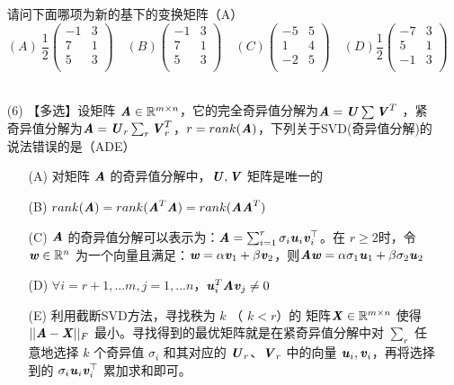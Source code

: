 \documentclass[12pt,a4paper,openany,twoside]{ctexbook}
\begin{document}
\begin{exercise}
\begin{itemize}
			请问下面哪项为新的基下的变换矩阵（A）	
		$$
		(A)\  \frac{1}{2}
\begin{pmatrix}
-1 & 3 \\
7 & 1 \\
5 & 3 \\
\end{pmatrix}
\quad
(B) \begin{pmatrix}
-1 & 3 \\
7 & 1 \\
5 & 3 \\
\end{pmatrix}
\quad
(C) \begin{pmatrix}
-5 & 5 \\
1 & 4 \\
-2 & 5 \\
\end{pmatrix}
\quad
(D) \frac{1}{2}
\begin{pmatrix}
-7 & 3 \\
5 & 1 \\
-1 & 3 \\
\end{pmatrix}
		$$
\\
		\item [(6)] 【多选】设矩阵 $\MA\in \mathbb{R}^{m \times n}$，它的完全奇异值分解为$\MA=\MU \sum \MV^T$ ，紧奇异值分解为$\MA=\MU_r \sum_r \MV_r^T$，$r=rank(\MA)$，下列关于SVD(奇异值分解)的说法错误的是（ADE）
		
		
		\begin{itemize}
			\item [(A)] 对矩阵 $\MA$ 的奇异值分解中，$\MU,\MV$ 矩阵是唯一的
			\item [(B)] $rank(\MA)=rank(\MA^T\MA)=rank(\MA\MA^T)$
			\item [(C)] $\MA$ 的奇异值分解可以表示为：$\MA = \sum_{i=1}^r \sigma_i \Vu_i \Vv_i^\top$。在 $r \geq 2 $时，令 $\Vw \in \mathbb{R}^n $ 为一个向量且满足：$\Vw = \alpha \Vv_1 + \beta \Vv_2$，则$\MA\Vw=\alpha \sigma_1 \Vu_1+\beta \sigma_2 \Vu_2$
			\item [(D)] $\forall i=r+1,...m,j=1,...n$，$\Vu_i^T\MA\Vv_j\not=0$
			\item [(E)] 利用截断SVD方法，寻找秩为 $k$ （ $k<r$）的 矩阵$\MX\in \mathbb{R}^{m \times n}$ 使得 $||\MA-\MX||_F$ 最小。寻找得到的最优矩阵就是在紧奇异值分解中对 $\sum_r$ 任意地选择 $k$ 个奇异值 $\sigma_i$ 和其对应的 $\MU_r$、$\MV_r$ 中的向量 $\Vu_i,\Vv_i$，再将选择到的 $\sigma_i \Vu_i \Vv_i^\top$ 累加求和即可。
		\end{itemize}
	\end{itemize}
	
\end{exercise}
\end{document}
